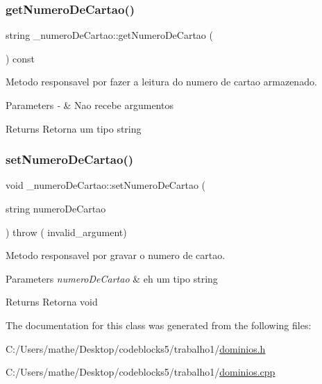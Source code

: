 \subsubsection{\texorpdfstring{getNumeroDeCartao()}{getNumeroDeCartao()}}
{\footnotesize\ttfamily string \+\_\+numero\+De\+Cartao\+::get\+Numero\+De\+Cartao (\begin{DoxyParamCaption}{ }\end{DoxyParamCaption}) const\hspace{0.3cm}{\ttfamily [inline]}}



Metodo responsavel por fazer a leitura do numero de cartao armazenado. 


\begin{DoxyParams}{Parameters}
{\em -\/} & Nao recebe argumentos \\
\hline
\end{DoxyParams}
\begin{DoxyReturn}{Returns}
Retorna um tipo string 
\end{DoxyReturn}
\mbox{\label{class__numero_de_cartao_adc6b5522ac0cc47ba4985519d8d9c90a}} 
\subsubsection{\texorpdfstring{setNumeroDeCartao()}{setNumeroDeCartao()}}
{\footnotesize\ttfamily void \+\_\+numero\+De\+Cartao\+::set\+Numero\+De\+Cartao (\begin{DoxyParamCaption}\item[{string}]{numero\+De\+Cartao }\end{DoxyParamCaption}) throw ( invalid\+\_\+argument) }



Metodo responsavel por gravar o numero de cartao. 


\begin{DoxyParams}{Parameters}
{\em numero\+De\+Cartao} & eh um tipo string \\
\hline
\end{DoxyParams}
\begin{DoxyReturn}{Returns}
Retorna void 
\end{DoxyReturn}


The documentation for this class was generated from the following files\+:\begin{DoxyCompactItemize}
\item 
C\+:/\+Users/mathe/\+Desktop/codeblocks5/trabalho1/\mbox{\hyperlink{dominios_8h}{dominios.\+h}}\item 
C\+:/\+Users/mathe/\+Desktop/codeblocks5/trabalho1/\mbox{\hyperlink{dominios_8cpp}{dominios.\+cpp}}\end{DoxyCompactItemize}
